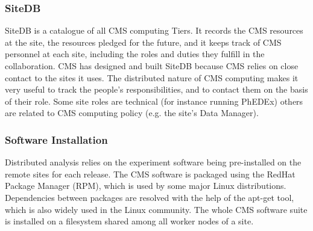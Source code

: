 \subsubsection{ SiteDB }
\label{sec:4_1_2}
SiteDB is a catalogue of all CMS computing Tiers.
It records the CMS resources at the site, the resources pledged for the future,
and it keeps track of CMS personnel at each site, including the roles
and duties they fulfill in the collaboration.
CMS has designed and built SiteDB because CMS relies on close contact
to the sites it uses. The distributed nature of CMS computing makes
it very useful to track the people's responsibilities, and to contact
them on the basis of their role. Some site roles are technical
 (for instance running PhEDEx) others are related to CMS computing
 policy (e.g. the site's Data Manager).

\subsubsection{ Software Installation }
\label{sec:4_1_3}
Distributed analysis relies on the experiment software being
pre-installed on the remote sites for each release. The CMS software
is packaged using the RedHat Package Manager (RPM), which is used by
some major Linux distributions. Dependencies between packages are
resolved with the help of the apt-get tool, which is also widely used in
the Linux community. The whole CMS software suite is installed
on a filesystem shared among all worker nodes of a site.

